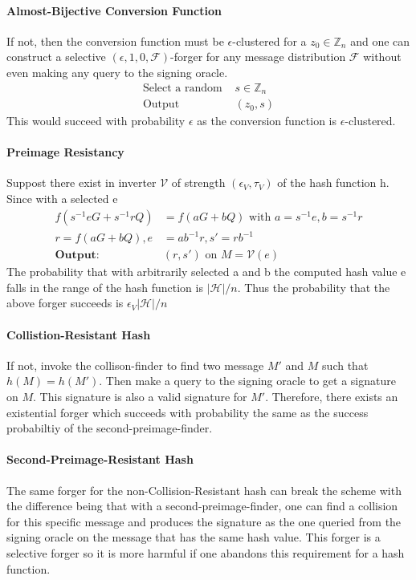 \documentclass[12]{article}
\begin{document}
\paragraph{Almost-Bijective Conversion Function}
If not, then the conversion function must be $\epsilon$-clustered for a $z_0\in \mathbb{Z}_n$ and one can construct a selective
$(\epsilon, 1, 0, \mathscr{F})$-forger for any message distribution $\mathscr{F}$ without even making any query to the signing oracle.
\begin{align*}
\text{Select a random } &s\in \mathbb{Z}_n\\
\text{Output } &(z_0,s)
\end{align*}
This would succeed with probability $\epsilon$ as the conversion function is $\epsilon$-clustered.

\paragraph{Preimage Resistancy}
Suppost there exist in inverter $\mathscr{V}$ of strength $(\epsilon_V, \tau_V)$ of the hash function h. Since with a selected e
\begin{align*}
f(s^{-1}eG+s^{-1}rQ) &= f(aG+bQ) \text{ with } a=s^{-1}e, b=s^{-1}r \\
r=f(aG+bQ), e&=ab^{-1}r,  s\prime = rb^{-1}\\
\textbf{Output: }&(r,s\prime) \text{ on } M=\mathscr{V}(e)
\end{align*}
The probability that with arbitrarily selected a and b the computed hash value e falls in the range of the hash function is $|\mathscr{H}|/n$. Thus the probability that the above forger succeeds is $\epsilon_V|\mathscr{H}|/n$
\paragraph{Collistion-Resistant Hash}
If not, invoke the collison-finder to find two message $M'$ and $M$ such that $h(M)=h(M')$. Then make a query to the signing oracle to get a signature on $M$. This signature is also a valid signature for $M'$. Therefore, there exists an existential forger which succeeds with probability the same as the success probabiltiy of the second-preimage-finder.
\paragraph{Second-Preimage-Resistant Hash}
The same forger for the non-Collision-Resistant hash can break the scheme with the difference being that with a second-preimage-finder, one can find a collision for this specific message and produces the signature as the one queried from the signing oracle on the message that has the same hash value.
This forger is a selective forger so it is more harmful if one abandons this requirement for a hash function.
\end{document}

